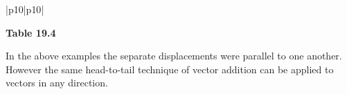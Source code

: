 \begin{center}
\begin{xtabular*}{\mytablewidth}[t]{|p{10\mystarwidth}|p{10\mystarwidth}|}
\begin{center}
      \vspace{2pt}
    \vspace{.1in}
    
    \end{center}



    \addtocounter{footnote}{-0}
    
     \tabularnewline{}
    \end{xtabular*}
      \end{center}
    \begin{center}{\small\bfseries Table 19.4}\end{center}
    
    \addtocounter{footnote}{-0}
    
    \par
  
        
        \label{m38813*id188761}In the above examples the separate displacements were parallel to one
another. However the same head-to-tail technique of vector addition
can be applied to vectors in any direction.\par 
        
    
      
    
    \setlength\mytablespace{6\tabcolsep}
    \addtolength\mytablespace{4\arrayrulewidth}
    \setlength\mytablewidth{\linewidth}
        
    
    \setlength\mytableroom{\mytablewidth}
    \addtolength\mytableroom{-\mytablespace}
    

